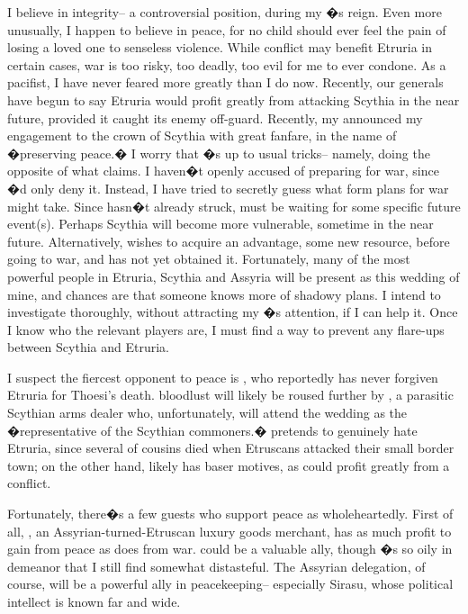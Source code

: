 \documentclass[char]{Kos}
\begin{document}
I believe in integrity-- a controversial position, during my \cEtruriaKing{\parent}�s reign. Even more unusually, I happen to believe in peace, for no child should ever feel the pain of losing a loved one to senseless violence. While conflict may benefit Etruria in certain cases, war is too risky, too deadly, too evil for me to ever condone. As a pacifist, I have never feared more greatly than I do now. Recently, our generals have begun to say Etruria would profit greatly from attacking Scythia in the near future, provided it caught its enemy off-guard. Recently, my \cEtruriaKing{\parent} announced my engagement to the crown \cBride{\prince} of Scythia with great fanfare, in the name of �preserving peace.� I worry that \cEtruriaKing{\Parent}�s up to \cEtruriaKing{\their} usual tricks-- namely, doing the opposite of what \cEtruriaKing{\they} claims. I haven�t openly accused \cEtruriaKing{\them} of preparing for war, since \cEtruriaKing{\they}�d only deny it. Instead, I have tried to secretly guess what form \cEtruriaKing{\their} plans for war might take. Since \cEtruriaKing{\they} hasn�t already struck, \cEtruriaKing{\They} must be waiting for some specific future event(s). Perhaps Scythia will become more vulnerable, sometime in the near future. Alternatively, \cEtruriaKing{\they} wishes to acquire an advantage, some new resource, before going to war, and \cEtruriaKing{\they} has not yet obtained it. Fortunately, many of the most powerful people in Etruria, Scythia and Assyria will be present as this wedding of mine, and chances are that someone knows more of \cEtruriaKing{\their} shadowy plans. I intend to investigate thoroughly, without attracting my \cEtruriaKing{\parent}�s attention, if I can help it. Once I know who the relevant players are, I must find a way to prevent any flare-ups between Scythia and Etruria.

I suspect the fiercest opponent to peace is \cScythiaQueen{\Monarch} \cScythiaQueen{\nickname}, who reportedly has never forgiven Etruria for Thoesi's death. \cScythiaQueen{\Their} bloodlust will likely be roused further by \cArmsDealer{\name}, a parasitic Scythian arms dealer who, unfortunately, will attend the wedding as the �representative of the Scythian commoners.� \cArmsDealer{\They} pretends to genuinely hate Etruria, since several of \cArmsDealer{\their} cousins died when Etruscans attacked their small border town; on the other hand, \cArmsDealer{\they} likely has baser motives, as \cArmsDealer{\they} could profit greatly from a conflict. 

Fortunately, there�s a few guests who support peace as wholeheartedly. First of all, \cMerchant{\name}, an Assyrian-turned-Etruscan luxury goods merchant, has as much profit to gain from peace as \cArmsDealer{\nickname} does from war. \cMerchant{\nickname} could be a valuable ally, though \cMerchant{\they}�s so oily in \cMerchant{\their} demeanor that I still find \cMerchant{\them} somewhat distasteful. The Assyrian delegation, of course, will be a powerful ally in peacekeeping-- especially Sirasu, whose political intellect is known far and wide.
\end{document}
